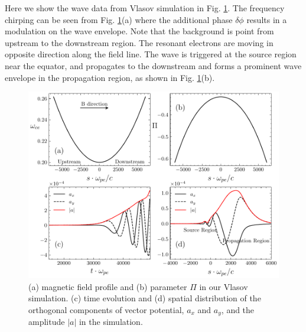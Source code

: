 Here we show the wave data from Vlasov simulation in Fig. \ref{fig.aanda}.
The frequency chirping can be seen from Fig. \ref{fig.aanda}(a) where the additional phase $\delta \phi$ results in a modulation on the wave envelope.
Note that the background is point from upstream to the downstream region.
The resonant electrons are moving in opposite direction along the field line.
The wave is triggered at the source region near the equator, and propagates to the downstream and forms a prominent wave envelope in the propagation region, as shown in Fig. \ref{fig.aanda}(b).



\begin{figure}
    \centering
    \includegraphics[scale=0.5]{img/aanda.pdf}
    \caption{(a) magnetic field profile and (b) parameter $\Pi$ in our Vlasov simulation. (c) time evolution and (d) spatial distribution of the orthogonal components of vector potential, $a_x$ and $a_y$, and the amplitude $|a|$ in the simulation.
    \label{fig.aanda}
    }
\end{figure}

